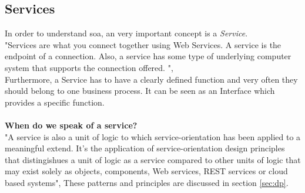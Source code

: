 \documentclass[10pt]{article}
\begin{document}
\subsection{Services}
In order to understand \gls{soa}, an very important concept is a \textit{Service}. \\
"Services are what you connect together using Web Services. A service is the endpoint of a connection. Also, a service has some type of underlying computer system that supports the connection offered. ",\cite{service1} \\ Furthermore, a Service has to have a clearly defined function and very often they should belong to one business process. It can be seen as an Interface which provides a specific function.\\ \\
\textbf{When do we speak of a service?}\\
"A service is also a unit of logic to which service-orientation has been applied to a meaningful extend. It's the application of service-orientation design principles that distingishues a unit of logic as a service compared to other units of logic that may exist solely as objects, components, Web services, REST services or cloud based systems",\cite[page 29]{grau} These patterns and principles are discussed in section \ref{sec:dp}. 
\end{document}
